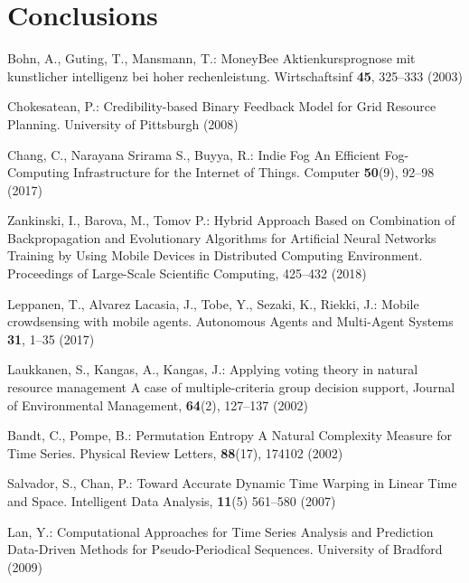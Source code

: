 \documentclass[runningheads]{llncs}
\begin{document}
\section{Conclusions}
%
%
%
% 
% 
%
\begin{thebibliography}{8}

 Bohn, A., Guting, T., Mansmann, T.: MoneyBee Aktienkursprognose mit kunstlicher intelligenz bei hoher rechenleistung. Wirtschaftsinf \textbf{45}, 325--333 (2003)

 Chokesatean, P.: Credibility-based Binary Feedback Model for Grid Resource Planning. University of Pittsburgh (2008)

 Chang, C., Narayana Srirama S., Buyya, R.: Indie Fog An Efficient Fog-Computing Infrastructure for the Internet of Things. Computer \textbf{50}(9), 92--98 (2017)

 Zankinski, I., Barova, M., Tomov P.: Hybrid Approach Based on Combination of Backpropagation and Evolutionary Algorithms for Artificial Neural Networks Training by Using Mobile Devices in Distributed Computing Environment. Proceedings of Large-Scale Scientific Computing, 425--432 (2018)

 Leppanen, T., Alvarez Lacasia, J., Tobe, Y., Sezaki, K., Riekki, J.: Mobile crowdsensing with mobile agents. Autonomous Agents and Multi-Agent Systems \textbf{31}, 1--35 (2017)

 Laukkanen, S., Kangas, A., Kangas, J.: Applying voting theory in natural resource management A case of multiple-criteria group decision support, Journal of Environmental Management, \textbf{64}(2), 127--137 (2002)

 Bandt, C., Pompe, B.: Permutation Entropy A Natural Complexity Measure for Time Series. Physical Review Letters, \textbf{88}(17), 174102 (2002)

 Salvador, S., Chan, P.: Toward Accurate Dynamic Time Warping in Linear Time and Space. Intelligent Data Analysis, \textbf{11}(5) 561--580 (2007)

 Lan, Y.: Computational Approaches for Time Series Analysis and Prediction Data-Driven Methods for Pseudo-Periodical Sequences. University of Bradford (2009)


\end{thebibliography}
\end{document}

